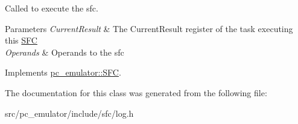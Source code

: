 Called to execute the sfc. 


\begin{DoxyParams}{Parameters}
{\em Current\+Result} & The Current\+Result register of the task executing this \hyperlink{classpc__emulator_1_1SFC}{S\+FC} \\
\hline
{\em Operands} & Operands to the sfc \\
\hline
\end{DoxyParams}


Implements \hyperlink{classpc__emulator_1_1SFC_ab206c80fc0e429c56672b4f6a0ca8635}{pc\+\_\+emulator\+::\+S\+FC}.



The documentation for this class was generated from the following file\+:\begin{DoxyCompactItemize}
\item 
src/pc\+\_\+emulator/include/sfc/log.\+h\end{DoxyCompactItemize}

